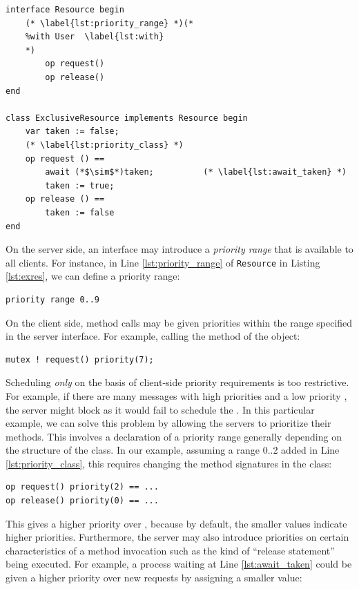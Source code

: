 \begin{lstlisting}[float=t, label=lst:exres, caption=Exclusive Resource in Creol %, multicols=2
]
interface Resource begin
	(* \label{lst:priority_range} *)(*
	%with User  \label{lst:with} 
	*)
		op request()
		op release()
end

class ExclusiveResource implements Resource begin
	var taken := false;
	(* \label{lst:priority_class} *)
	op request () == 
		await (*$\sim$*)taken; 			(* \label{lst:await_taken} *)
		taken := true;
	op release () ==
		taken := false
end
\end{lstlisting}


On the server side, an interface may introduce a \textit{priority
range} that is available to all clients. For instance, in Line
\ref{lst:priority_range} of {\footnotesize\texttt{Resource}} in Listing
\ref{lst:exres}, we can define a priority range: 

\begin{lstlisting}[frame=none, numbers=none]
priority range 0..9
\end{lstlisting}


On the client side, method calls may be given priorities within the range specified in the server interface. For example, calling the  method of the  object: 

\begin{lstlisting}[frame=none, numbers=none]
mutex ! request() priority(7);
\end{lstlisting}


Scheduling \textit{only} on the basis of client-side priority requirements is too restrictive.
For example, if there are many  messages with high priorities and a low priority , the server might block as it would fail to schedule the .
In this particular example, we can solve this problem by allowing the servers to
prioritize their methods.
This involves a declaration of a priority range generally depending on the structure of the class. 
In our example, assuming a range 0..2 added in Line \ref{lst:priority_class}, this requires changing the method signatures in the {} class: 

\begin{lstlisting}[frame=none, numbers=none]
op request() priority(2) == ...
op release() priority(0) == ...
\end{lstlisting}


This gives   a higher priority over , because by default, the smaller values indicate higher priorities.
Furthermore, the server may also introduce priorities on certain 
characteristics of a method invocation such as the kind of ``release statement''
being executed. 
For example, a process waiting at Line \ref{lst:await_taken} could be given a higher priority over new requests by assigning a smaller value:

